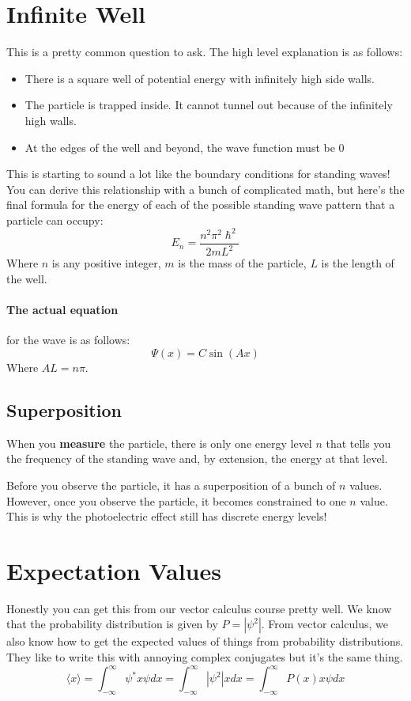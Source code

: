 \documentclass[a4paper,12pt]{report}
\begin{document}
\section{Infinite Well}
This is a pretty common question to ask. The high level explanation is as follows:
\begin{itemize}
\item There is a square well of potential energy with infinitely high side walls.
\item The particle is trapped inside. It cannot tunnel out because of the infinitely high walls.
\item At the edges of the well and beyond, the wave function must be 0
\end{itemize}
This is starting to sound a lot like the boundary conditions for standing waves! You can derive this relationship with a bunch
of complicated math, but here's the final formula for the energy of each of the possible standing wave pattern that a particle 
can occupy: 
$$E_n = \frac{n^2\pi^2\hslash^2}{2mL^2}$$
Where $n$ is any positive integer, $m$ is the mass of the particle, $L$ is the length of the well. 

\paragraph{The actual equation} for the wave is as follows: $$\Psi(x) = C\sin(Ax)$$
Where $AL = n\pi$.

\subsection{Superposition}
When you \textbf{measure} the particle, there is only one energy level $n$ that tells you the frequency of the standing wave and, by extension, 
the energy at that level.

Before you observe the particle, it has a superposition of a bunch of $n$ values. However, once you observe the particle, it becomes constrained 
to one $n$ value. This is why the photoelectric effect still has discrete energy levels!

\section{Expectation Values}
Honestly you can get this from our vector calculus course pretty well. We know that the probability distribution is given by $P = |\psi^2|$. From vector calculus, 
we also know how to get the expected values of things from probability distributions. They like to write this with annoying complex conjugates but it's the same thing.
$$\langle x \rangle = \int_{-\infty}^{\infty}\psi^* x \psi dx = \int_{-\infty}^{\infty}|\psi^2| x dx = \int_{-\infty}^{\infty}P(x) x \psi dx$$
\end{document}
